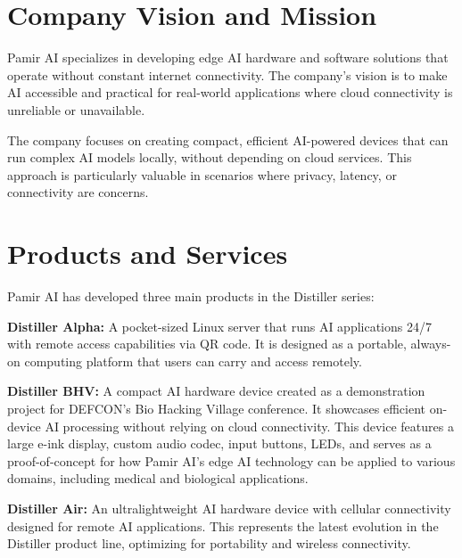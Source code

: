 \documentclass[12pt,a4paper]{report}
\begin{document}
\section{Company Vision and Mission}

Pamir AI specializes in developing edge AI hardware and software solutions that operate without constant internet connectivity. The company's vision is to make AI accessible and practical for real-world applications where cloud connectivity is unreliable or unavailable.

\vspace{0.3cm}

The company focuses on creating compact, efficient AI-powered devices that can run complex AI models locally, without depending on cloud services. This approach is particularly valuable in scenarios where privacy, latency, or connectivity are concerns.

\section{Products and Services}

Pamir AI has developed three main products in the Distiller series:

\vspace{0.3cm}

\textbf{Distiller Alpha:} A pocket-sized Linux server that runs AI applications 24/7 with remote access capabilities via QR code. It is designed as a portable, always-on computing platform that users can carry and access remotely.

\vspace{0.3cm}

\textbf{Distiller BHV:} A compact AI hardware device created as a demonstration project for DEFCON's Bio Hacking Village conference. It showcases efficient on-device AI processing without relying on cloud connectivity. This device features a large e-ink display, custom audio codec, input buttons, LEDs, and serves as a proof-of-concept for how Pamir AI's edge AI technology can be applied to various domains, including medical and biological applications.

\vspace{0.3cm}

\textbf{Distiller Air:} An ultralightweight AI hardware device with cellular connectivity designed for remote AI applications. This represents the latest evolution in the Distiller product line, optimizing for portability and wireless connectivity.
\end{document}
